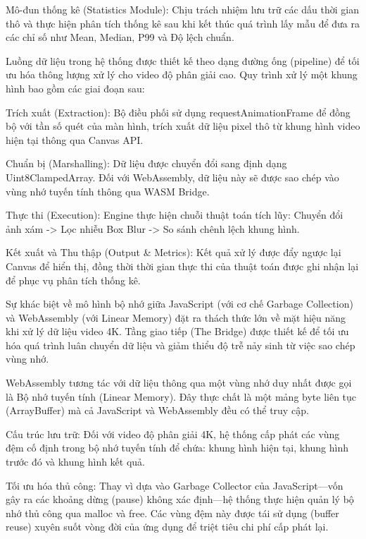 Mô-đun thống kê (Statistics Module): Chịu trách nhiệm lưu trữ các dấu thời gian thô và thực hiện phân tích thống kê sau khi kết thúc quá trình lấy mẫu để đưa ra các chỉ số như Mean, Median, P99 và Độ lệch chuẩn.



Luồng dữ liệu trong hệ thống được thiết kế theo dạng đường ống (pipeline) để tối ưu hóa thông lượng xử lý cho video độ phân giải cao. Quy trình xử lý một khung hình bao gồm các giai đoạn sau:


Trích xuất (Extraction): Bộ điều phối sử dụng requestAnimationFrame để đồng bộ với tần số quét của màn hình, trích xuất dữ liệu pixel thô từ khung hình video hiện tại thông qua Canvas API.


Chuẩn bị (Marshalling): Dữ liệu được chuyển đổi sang định dạng Uint8ClampedArray. Đối với WebAssembly, dữ liệu này sẽ được sao chép vào vùng nhớ tuyến tính thông qua WASM Bridge.


Thực thi (Execution): Engine thực hiện chuỗi thuật toán tích lũy: Chuyển đổi ảnh xám -\textgreater{} Lọc nhiễu Box Blur -\textgreater{} So sánh chênh lệch khung hình.


Kết xuất và Thu thập (Output \& Metrics): Kết quả xử lý được đẩy ngược lại Canvas để hiển thị, đồng thời thời gian thực thi của thuật toán được ghi nhận lại để phục vụ phân tích thống kê.



Sự khác biệt về mô hình bộ nhớ giữa JavaScript (với cơ chế Garbage Collection) và WebAssembly (với Linear Memory) đặt ra thách thức lớn về mặt hiệu năng khi xử lý dữ liệu video 4K. Tầng giao tiếp (The Bridge) được thiết kế để tối ưu hóa quá trình luân chuyển dữ liệu và giảm thiểu độ trễ nảy sinh từ việc sao chép vùng nhớ.



WebAssembly tương tác với dữ liệu thông qua một vùng nhớ duy nhất được gọi là Bộ nhớ tuyến tính (Linear Memory). Đây thực chất là một mảng byte liên tục (ArrayBuffer) mà cả JavaScript và WebAssembly đều có thể truy cập.


Cấu trúc lưu trữ: Đối với video độ phân giải 4K, hệ thống cấp phát các vùng đệm cố định trong bộ nhớ tuyến tính để chứa: khung hình hiện tại, khung hình trước đó và khung hình kết quả.


Tối ưu hóa thủ công: Thay vì dựa vào Garbage Collector của JavaScript—vốn gây ra các khoảng dừng (pause) không xác định—hệ thống thực hiện quản lý bộ nhớ thủ công qua malloc và free. Các vùng đệm này được tái sử dụng (buffer reuse) xuyên suốt vòng đời của ứng dụng để triệt tiêu chi phí cấp phát lại.


